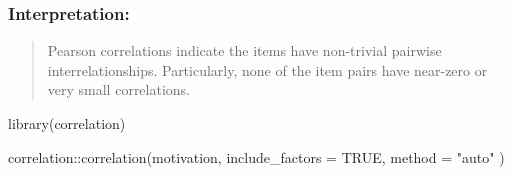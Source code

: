 \documentclass[
]{article}
\newenvironment{Shaded}{\begin{snugshade}}{\end{snugshade}}
\newcommand{\AttributeTok}[1]{\textcolor[rgb]{0.77,0.63,0.00}{#1}}
\newcommand{\ConstantTok}[1]{\textcolor[rgb]{0.00,0.00,0.00}{#1}}
\newcommand{\FunctionTok}[1]{\textcolor[rgb]{0.00,0.00,0.00}{#1}}
\newcommand{\NormalTok}[1]{#1}
\newcommand{\SpecialCharTok}[1]{\textcolor[rgb]{0.00,0.00,0.00}{#1}}
\newcommand{\StringTok}[1]{\textcolor[rgb]{0.31,0.60,0.02}{#1}}
\begin{document}
\hypertarget{interpretation-2}{%
\subsubsection{Interpretation:}\label{interpretation-2}}

\begin{quote}
Pearson correlations indicate the items have non-trivial pairwise
interrelationships. Particularly, none of the item pairs have near-zero
or very small correlations.
\end{quote}

\begin{Shaded}
\begin{Highlighting}[]
\FunctionTok{library}\NormalTok{(correlation)}

\NormalTok{correlation}\SpecialCharTok{::}\FunctionTok{correlation}\NormalTok{(motivation,}
                         \AttributeTok{include\_factors =} \ConstantTok{TRUE}\NormalTok{, }\AttributeTok{method =} \StringTok{"auto"}
\NormalTok{)}
\end{Highlighting}
\end{Shaded}
\end{document}
